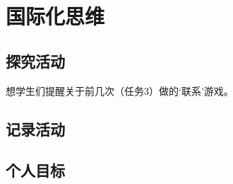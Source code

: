 \chapter{国际化思维}
    

\section{探究活动}
    想学生们提醒关于前几次（任务3）做的‘联系’游戏。


\section{记录活动}


\section{个人目标}
